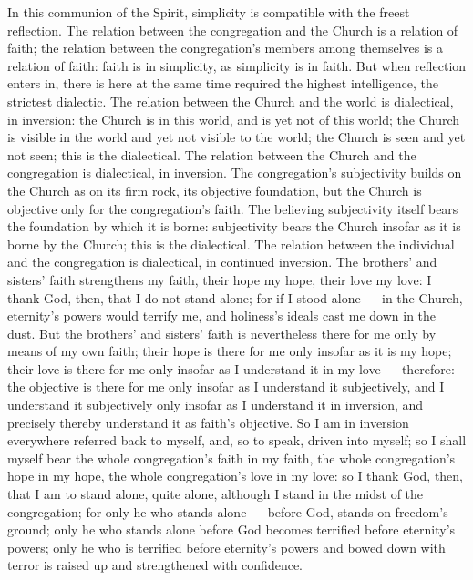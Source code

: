 \documentclass[12pt,a4paper]{book}
\begin{document}
In this communion of the Spirit, simplicity is compatible with the freest reflection. The relation between
the congregation and the Church is a relation of faith; the relation between the congregation's members
among themselves is a relation of faith: faith is in simplicity, as simplicity is in faith. But when
reflection enters in, there is here at the same time required the highest intelligence, the strictest
dialectic. The relation between the Church and the world is dialectical, in inversion: the Church is in
this world, and is yet not of this world; the Church is visible in the world and yet not visible to the
world; the Church is seen and yet not seen; this is the dialectical. The relation between the Church and
the congregation is dialectical, in inversion.
The congregation's subjectivity builds on the Church as on its firm rock, its objective foundation, but the
Church is objective only for the congregation's faith. The believing subjectivity itself bears the
foundation by which it is borne: subjectivity bears the Church insofar as it is borne by the Church; this
is the dialectical. The relation between the individual and the congregation is dialectical, in continued
inversion. The brothers' and sisters' faith strengthens my faith, their hope my hope, their love my love: I
thank God, then, that I do not stand alone; for if I stood alone --- in the Church, eternity's powers would
terrify me, and holiness's ideals cast me down in the dust. But the brothers' and sisters' faith is
nevertheless there for me only by means of my own faith; their hope is there for me only insofar as it is my
hope; their love is there for me only insofar as I understand it in my love --- therefore: the objective is
there for me only insofar as I understand it subjectively, and I understand it subjectively only insofar as
I understand it in inversion, and precisely thereby understand it as faith's objective. So I am in inversion
everywhere referred back to myself, and, so to speak, driven into myself; so I shall myself bear the whole
congregation's faith in my faith, the whole congregation's hope in my hope, the whole congregation's love in
my love: so I thank God, then, that I am to stand alone, quite alone, although I stand in the midst of the
congregation; for only he who stands alone --- before God, stands on freedom's ground; only he who stands
alone before God becomes terrified before eternity's powers; only he who is terrified before eternity's
powers and bowed down with terror is raised up and strengthened with confidence.
\end{document}
